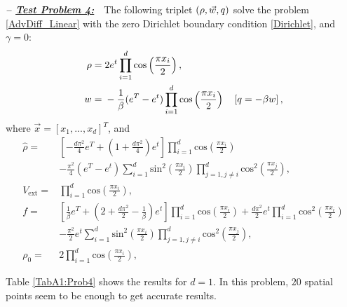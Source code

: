 \textbf{\emph{-- \underline{Test Problem 4:}}}~~The following triplet $(\rho,\vec{w},q)$ solve the problem \eqref{AdvDiff_Linear} with the zero Dirichlet boundary condition \eqref{Dirichlet}, and $\gamma =0$:
\begin{align*}
\ \rho={}&2e^{t}\prod_{i=1}^{d}\text{cos}\left(\frac{\pi{}x_i}{2}\right), \\
\ w={}&-\frac{1}{\beta}(e^{T}-e^{t})\prod_{i=1}^{d}\text{cos}\left(\frac{\pi{}x_i}{2}\right)\quad\left[\adj=-\beta{}w\right],
\end{align*}
where $\vec{x}=[x_1,...,x_d]^T$, and
\begin{align*}
\ \widehat{\rho}={}&\left[-\frac{d\pi^2}{4}e^{T}+\left(1+\frac{d\pi^2}{4}\right)e^{t}\right]\prod_{i=1}^{d}\text{cos}\left(\frac{\pi{}x_i}{2}\right) \\
\ &-\frac{\pi^2}{4}(e^{T}-e^{t})\sum_{i=1}^{d}\text{sin}^2\left(\frac{\pi{}x_i}{2}\right)\prod_{j=1,j\neq{}i}^{d}\text{cos}^2\left(\frac{\pi{}x_j}{2}\right), \\
\ V_{\text{ext}}={}&\prod_{i=1}^{d}\text{cos}\left(\frac{\pi{}x_i}{2}\right), \\
\ f={}&\left[\frac{1}{\beta}e^{T}+\left(2+\frac{d\pi^2}{2}-\frac{1}{\beta}\right)e^{t}\right]\prod_{i=1}^{d}\text{cos}\left(\frac{\pi{}x_i}{2}\right)+\frac{d\pi^{2}}{2}e^{t}\prod_{i=1}^{d}\text{cos}^2\left(\frac{\pi{}x_i}{2}\right) \\
\ &-\frac{\pi^2}{2}e^{t}\sum_{i=1}^{d}\text{sin}^2\left(\frac{\pi{}x_i}{2}\right)\prod_{j=1,j\neq{}i}^{d}\text{cos}^2\left(\frac{\pi{}x_j}{2}\right), \\
\ \rho_{0}={}&2\prod_{i=1}^{d}\text{cos}\left(\frac{\pi{}x_i}{2}\right),
\end{align*}

Table \ref{TabA1:Prob4} shows the results for $d=1$. In this problem, $20$ spatial points seem to be enough to get accurate results.

